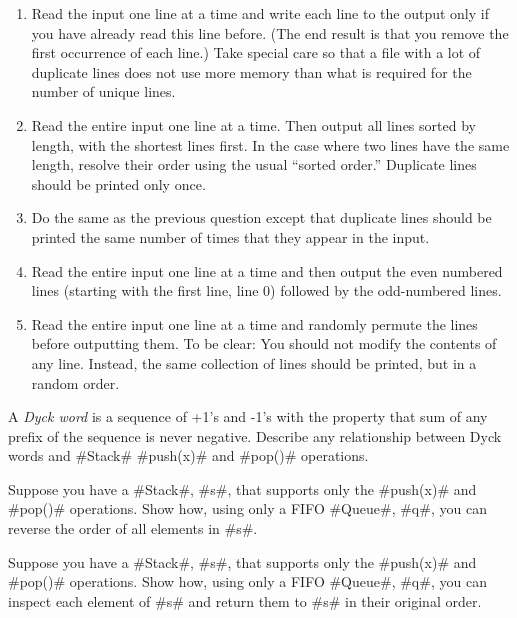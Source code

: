 \begin{exc}
\begin{enumerate}
    \item Read the input one line at a time and write each line to the
      output only if you have already read this line before. (The end
      result is that you remove the first occurrence of each line.)
      Take special care so that a file with a lot of duplicate lines
      does not use more memory than what is required for the number of
      unique lines.

    \item Read the entire input one line at a time. Then output all lines
      sorted by length, with the shortest lines first. In the case where
      two lines have the same length, resolve their order using the usual
      ``sorted order.''  Duplicate lines should be printed only once.

    \item Do the same as the previous question except that duplicate lines
      should be printed the same number of times that they appear in the input.

    \item Read the entire input one line at a time and then output the
      even numbered lines (starting with the first line, line 0) followed
      by the odd-numbered lines.

    \item Read the entire input one line at a time and randomly permute
      the lines before outputting them.  To be clear: You should not
      modify the contents of any line. Instead, the same collection of
      lines should be printed, but in a random order.
  \end{enumerate}
\end{exc}

\begin{exc}
  A \emph{Dyck word} is a sequence of +1's and -1's with the property
  that sum of any prefix of the sequence is never negative.  Describe any
  relationship between Dyck words and #Stack# #push(x)# and #pop()#
  operations.
\end{exc}

\begin{exc}
  Suppose you have a #Stack#, #s#, that supports only the #push(x)#
  and #pop()# operations. Show how, using only a FIFO #Queue#, #q#,
  you can reverse the order of all elements in #s#.
\end{exc}


\begin{exc}
  Suppose you have a #Stack#, #s#, that supports only the #push(x)#
  and #pop()# operations. Show how, using only a FIFO #Queue#, #q#,
  you can inspect each element of #s# and return them to #s# in their
  original order.
\end{exc}

